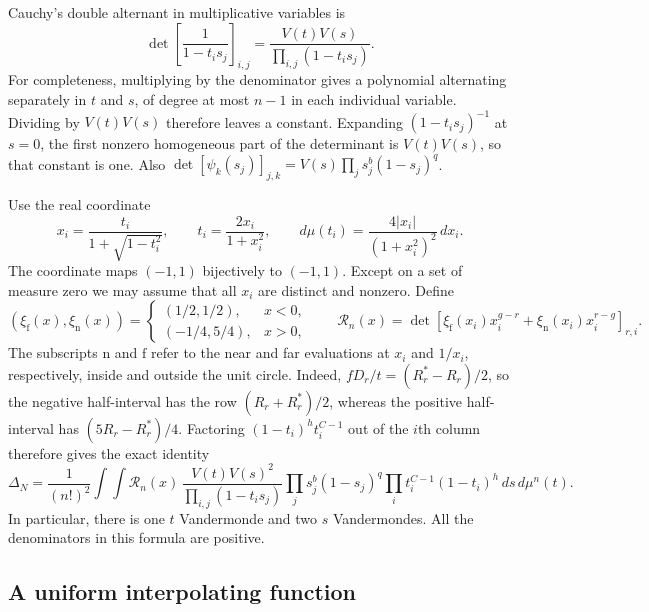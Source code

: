 Cauchy's double alternant in multiplicative variables
\cite[Section~2.1, Equation~(2.7)]{Krattenthaler1999} is
\begin{equation}\label{eq:real-cauchy-determinant}
 \det\left[\frac1{1-t_i s_j}\right]_{i,j}
 =\frac{V(t)V(s)}{\prod_{i,j}(1-t_i s_j)}.
\end{equation}
For completeness, multiplying by the denominator gives a polynomial
alternating separately in $t$ and $s$, of degree at most $n-1$ in each
individual variable.  Dividing by $V(t)V(s)$ therefore leaves a constant.
Expanding $(1-t_i s_j)^{-1}$ at $s=0$, the first nonzero homogeneous
part of the determinant is $V(t)V(s)$, so that constant is one.  Also
$\det[\psi_k(s_j)]_{j,k}=V(s)\prod_j s_j^b(1-s_j)^q$.

Use the real coordinate
\begin{equation}\label{eq:real-coordinate}
 x_i=\frac{t_i}{1+\sqrt{1-t_i^2}},\qquad
 t_i=\frac{2x_i}{1+x_i^2},\qquad
 d\mu(t_i)=\frac{4|x_i|}{(1+x_i^2)^2}\,dx_i.
\end{equation}
The coordinate maps $(-1,1)$ bijectively to $(-1,1)$.  Except on a
set of measure zero we may assume that all $x_i$ are distinct and
nonzero.  Define
\[
 (\xi_{\mathrm f}(x),\xi_{\mathrm n}(x))=
 \begin{cases}(1/2,1/2),&x<0,\\(-1/4,5/4),&x>0,\end{cases}
 \qquad
 \mathcal R_n(x)=
 \det\left[\xi_{\mathrm f}(x_i)x_i^{g-r}
             +\xi_{\mathrm n}(x_i)x_i^{r-g}\right]_{r,i}.
\]
The subscripts $\mathrm n$ and $\mathrm f$ refer to the near and far
evaluations at $x_i$ and $1/x_i$, respectively, inside and outside the
unit circle.
Indeed, $fD_r/t=(R_r^*-R_r)/2$, so the negative half-interval
has the row $(R_r+R_r^*)/2$, whereas the positive half-interval has
$(5R_r-R_r^*)/4$.  Factoring $(1-t_i)^ht_i^{C-1}$ out of the
$i$th column therefore gives the exact identity
\begin{equation}\label{eq:real-sheet-integral}
 \Delta_N=\frac1{(n!)^2}\int\!\int
 \mathcal R_n(x)\,
 \frac{V(t)V(s)^2}{\prod_{i,j}(1-t_i s_j)}
 \prod_j s_j^b(1-s_j)^q
 \prod_i t_i^{C-1}(1-t_i)^h\,ds\,d\mu^n(t).
\end{equation}
In particular, there is one $t$ Vandermonde and two $s$
Vandermondes.  All the denominators in this formula are positive.

\subsection{A uniform interpolating function}

